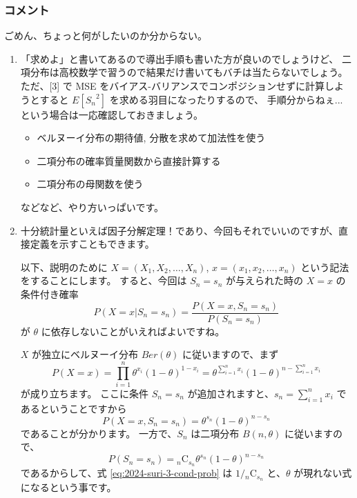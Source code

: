 \documentclass[./main.tex]{subfiles}
\begin{document}
    \subsubsection*{コメント}
    ごめん、ちょっと何がしたいのか分からない。
    \begin{enumerate}
        \item 「求めよ」と書いてあるので導出手順も書いた方が良いのでしょうけど、
        二項分布は高校数学で習うので結果だけ書いてもバチは当たらないでしょう。
        ただ、[3] で MSE をバイアス-バリアンスでコンポジションせずに計算しようとすると $E[{S_n}^2]$ を求める羽目になったりするので、
        手順分からねぇ...という場合は一応確認しておきましょう。

        \begin{itemize}
            \item ベルヌーイ分布の期待値, 分散を求めて加法性を使う
            \item 二項分布の確率質量関数から直接計算する
            \item 二項分布の母関数を使う
        \end{itemize}
        などなど、やり方いっぱいです。

        \item 十分統計量といえば因子分解定理！であり、今回もそれでいいのですが、直接定義を示すこともできます。
        
        以下、説明のために $X = (X_1, X_2, \dots, X_n)$, $x = (x_1, x_2, \dots, x_n)$ という記法をすることにします。
        すると、今回は $S_n = s_n$ が与えられた時の $X = x$ の条件付き確率
        \begin{equation}
            P ( X = x \vert S_n = s_n)
                = \frac{P(X = x, S_n = s_n)}{P(S_n = s_n)}
                \label{eq:2024-suri-3-cond-prob}
        \end{equation}
        が $\theta$ に依存しないことがいえればよいですね。

        $X$ が独立にベルヌーイ分布 $Ber(\theta)$ に従いますので、まず
        \begin{equation*}
            P(X = x) = \prod_{i=1}^{n} \theta^{x_i} (1 - \theta)^{1 - x_i}
                = \theta^{\sum_{i=1}^n x_i}
                    (1 - \theta)^{ n - \sum_{i=1}^n x_i}
        \end{equation*}
        が成り立ちます。
        ここに条件 $S_n = s_n$ が追加されますと、$s_n = \sum_{i=1}^{n} x_i$ であるということですから
        \begin{equation*}
            P(X = x, S_n = s_n)
                = \theta^{s_n}  (1 - \theta)^{n - s_n}
        \end{equation*}
        であることが分かります。
        一方で、$S_n$ は二項分布 $B (n, \theta)$ に従いますので、
        \begin{equation*}
            P (S_n = s_n) = {}_{n} \mathrm{C}_{s_n} \theta^{s_n} (1 - \theta)^{n - s_n}
        \end{equation*}
        であるからして、式 \eqref{eq:2024-suri-3-cond-prob} は $1 / {}_n \mathrm{C}_{s_n}$ と、$\theta$ が現れない式になるという事です。


\end{enumerate}
\end{document}

